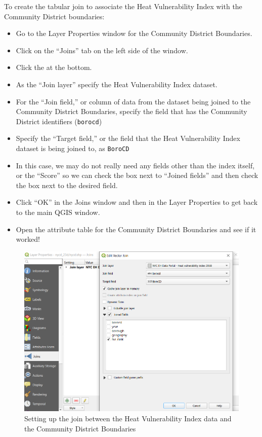 \documentclass[
  letterpaper,
  DIV=11,
  numbers=noendperiod]{scrreprt}
\providecommand{\tightlist}{%
  \setlength{\itemsep}{0pt}\setlength{\parskip}{0pt}}\usepackage{longtable,booktabs,array}
\begin{document}
To create the tabular join to associate the Heat Vulnerability Index
with the Community District boundaries:

\begin{itemize}
\tightlist
\item
  Go to the Layer Properties window for the Community District
  Boundaries.
\item
  Click on the ``Joins'' tab on the left side of the window.
\item
  Click the  at the
  bottom.
\item
  As the ``Join layer'' specify the Heat Vulnerability Index dataset.
\item
  For the ``Join field,'' or column of data from the dataset being
  joined to the Community District Boundaries, specify the field that
  has the Community District identifiers (\texttt{borocd})
\item
  Specify the ``Target field,'' or the field that the Heat Vulnerability
  Index dataset is being joined to, as \texttt{BoroCD}
\item
  In this case, we may do not really need any fields other than the
  index itself, or the ``Score'' so we can check the box next to
  ``Joined fields'' and then check the box next to the desired field.
\item
  Click ``OK'' in the Joins window and then in the Layer Properties to
  get back to the main QGIS window.
\item
  Open the attribute table for the Community District Boundaries and see
  if it worked!
\end{itemize}

\begin{figure}

{\centering \includegraphics{./images/TabularJoin.png}

}

\caption{Setting up the join between the Heat Vulnerability Index data
and the Community District Boundaries}

\end{figure}
\end{document}
